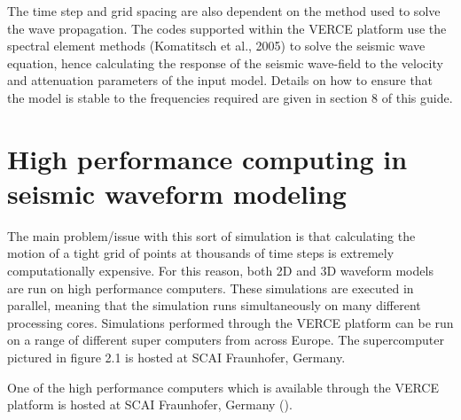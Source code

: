 \documentclass[english]{book}
\begin{document}
The time step and grid spacing are also dependent on the method used to
solve the wave propagation. The codes supported within the VERCE
platform use the spectral element methods (Komatitsch et al., 2005) to
solve the seismic wave equation, hence calculating the response of the
seismic wave-field to the velocity and attenuation parameters of the
input model. Details on how to ensure that the model is stable to the
frequencies required are given in section 8 of this guide.


\section{High performance computing in seismic waveform modeling}
\label{\detokenize{Section2:high-performance-computing-in-seismic-waveform-modeling}}
The main problem/issue with this sort of simulation is that calculating
the motion of a tight grid of points at thousands of time steps is
extremely computationally expensive. For this reason, both 2D and 3D
waveform models are run on high performance computers. These simulations
are executed in parallel, meaning that the simulation runs
simultaneously on many different processing cores. Simulations performed
through the VERCE platform can be run on a range of different super
computers from across Europe. The supercomputer pictured in figure 2.1
is hosted at SCAI Fraunhofer, Germany.

\begin{center}
\end{center}
 One of the high performance computers which is
available through the VERCE platform is hosted at SCAI Fraunhofer,
Germany ().
\end{document}
